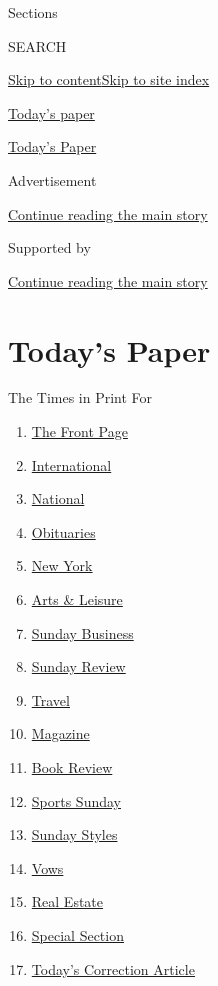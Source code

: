 Sections

SEARCH

\protect\hyperlink{site-content}{Skip to
content}\protect\hyperlink{site-index}{Skip to site index}

\href{https://www.nytimes3xbfgragh.onion/section/todayspaper}{Today's
paper}

\href{https://myaccount.nytimes3xbfgragh.onion/auth/login?response_type=cookie\&client_id=vi}{}

\href{https://www.nytimes3xbfgragh.onion/section/todayspaper}{Today's
Paper}

Advertisement

\protect\hyperlink{after-top}{Continue reading the main story}

Supported by

\protect\hyperlink{after-sponsor}{Continue reading the main story}

\hypertarget{todays-paper}{%
\section{Today's Paper}\label{todays-paper}}

The Times in Print For

\begin{enumerate}
\def\labelenumi{\arabic{enumi}.}
\tightlist
\item
  \protect\hyperlink{thefrontpage}{The Front Page}
\item
  \protect\hyperlink{international}{International}
\item
  \protect\hyperlink{national}{National}
\item
  \protect\hyperlink{obituaries}{Obituaries}
\item
  \protect\hyperlink{newyork}{New York}
\item
  \protect\hyperlink{artsux5cux26leisure}{Arts \& Leisure}
\item
  \protect\hyperlink{sundaybusiness}{Sunday Business}
\item
  \protect\hyperlink{sundayreview}{Sunday Review}
\item
  \protect\hyperlink{travel}{Travel}
\item
  \protect\hyperlink{magazine}{Magazine}
\item
  \protect\hyperlink{bookreview}{Book Review}
\item
  \protect\hyperlink{sportssunday}{Sports Sunday}
\item
  \protect\hyperlink{sundaystyles}{Sunday Styles}
\item
  \protect\hyperlink{vows}{Vows}
\item
  \protect\hyperlink{realestate}{Real Estate}
\item
  \protect\hyperlink{specialsection}{Special Section}
\item
  \protect\hyperlink{todayux27scorrectionarticle}{Today's Correction
  Article}
\end{enumerate}

